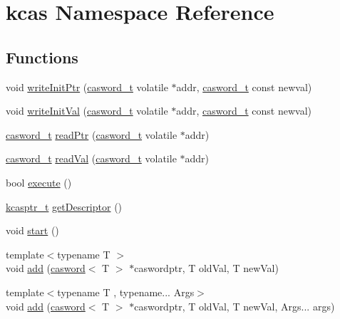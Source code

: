 \hypertarget{namespacekcas}{}\section{kcas Namespace Reference}
\label{namespacekcas}
\subsection*{Functions}
\begin{DoxyCompactItemize}
\item 
void \hyperlink{namespacekcas_a92e383d96831fa6163a3d562d4a38053}{write\+Init\+Ptr} (\hyperlink{rq__unsafe_8h_ad45142aaf2ff20a036dc6242b8483e9c}{casword\+\_\+t} volatile $\ast$addr, \hyperlink{rq__unsafe_8h_ad45142aaf2ff20a036dc6242b8483e9c}{casword\+\_\+t} const newval)
\item 
void \hyperlink{namespacekcas_abd890f3f111dbd76aba1be89220ea07d}{write\+Init\+Val} (\hyperlink{rq__unsafe_8h_ad45142aaf2ff20a036dc6242b8483e9c}{casword\+\_\+t} volatile $\ast$addr, \hyperlink{rq__unsafe_8h_ad45142aaf2ff20a036dc6242b8483e9c}{casword\+\_\+t} const newval)
\item 
\hyperlink{rq__unsafe_8h_ad45142aaf2ff20a036dc6242b8483e9c}{casword\+\_\+t} \hyperlink{namespacekcas_a1f34f966b2243f133f1d936ec1761578}{read\+Ptr} (\hyperlink{rq__unsafe_8h_ad45142aaf2ff20a036dc6242b8483e9c}{casword\+\_\+t} volatile $\ast$addr)
\item 
\hyperlink{rq__unsafe_8h_ad45142aaf2ff20a036dc6242b8483e9c}{casword\+\_\+t} \hyperlink{namespacekcas_a41e805427c946f9e77ae065c624b2399}{read\+Val} (\hyperlink{rq__unsafe_8h_ad45142aaf2ff20a036dc6242b8483e9c}{casword\+\_\+t} volatile $\ast$addr)
\item 
bool \hyperlink{namespacekcas_ae51aac13e4c5df1190241ae51968387a}{execute} ()
\item 
\hyperlink{kcas__reuse__impl_8h_a5bbc81d391bfd6b4288a0d33f105a0b2}{kcasptr\+\_\+t} \hyperlink{namespacekcas_aa3f3e7af6facd9b5108b3b3fe8e4ed82}{get\+Descriptor} ()
\item 
void \hyperlink{namespacekcas_a39af7f008e3b3cb3815045257d15e735}{start} ()
\item 
{\footnotesize template$<$typename T $>$ }\\void \hyperlink{namespacekcas_acb0544489e45e08050227ab563d9ee15}{add} (\hyperlink{structcasword}{casword}$<$ T $>$ $\ast$caswordptr, T old\+Val, T new\+Val)
\item 
{\footnotesize template$<$typename T , typename... Args$>$ }\\void \hyperlink{namespacekcas_a227f3321961ae92470ed749e94656202}{add} (\hyperlink{structcasword}{casword}$<$ T $>$ $\ast$caswordptr, T old\+Val, T new\+Val, Args... args)
\end{DoxyCompactItemize}
